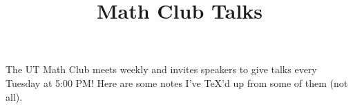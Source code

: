 \documentclass{scrartcl}
\title{Math Club Talks}
\date{}
\begin{document}
\maketitle
The UT Math Club meets weekly and invites speakers to give talks every Tuesday at 5:00 PM! Here are some notes I've \TeX{}'d up from some of them (not all).
\tableofcontents
    
\end{document}
